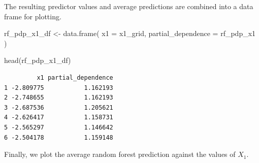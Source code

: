 \documentclass[
  letterpaper,
  DIV=11,
  numbers=noendperiod]{scrreprt}
\newenvironment{Shaded}{\begin{snugshade}}{\end{snugshade}}
\newcommand{\AttributeTok}[1]{\textcolor[rgb]{0.40,0.45,0.13}{#1}}
\newcommand{\ControlFlowTok}[1]{\textcolor[rgb]{0.00,0.23,0.31}{\textbf{#1}}}
\newcommand{\FunctionTok}[1]{\textcolor[rgb]{0.28,0.35,0.67}{#1}}
\newcommand{\NormalTok}[1]{\textcolor[rgb]{0.00,0.23,0.31}{#1}}
\newcommand{\OtherTok}[1]{\textcolor[rgb]{0.00,0.23,0.31}{#1}}
\newcommand{\SpecialCharTok}[1]{\textcolor[rgb]{0.37,0.37,0.37}{#1}}
\begin{document}
\begin{Shaded}
\end{Shaded}

The resulting predictor values and average predictions are combined into
a data frame for plotting.

\begin{Shaded}
\begin{Highlighting}[]
\NormalTok{rf\_pdp\_x1\_df }\OtherTok{\textless{}{-}} \FunctionTok{data.frame}\NormalTok{(}
  \AttributeTok{x1 =}\NormalTok{ x1\_grid,}
  \AttributeTok{partial\_dependence =}\NormalTok{ rf\_pdp\_x1}
\NormalTok{)}

\FunctionTok{head}\NormalTok{(rf\_pdp\_x1\_df)}
\end{Highlighting}
\end{Shaded}

\begin{verbatim}
         x1 partial_dependence
1 -2.809775           1.162193
2 -2.748655           1.162193
3 -2.687536           1.205621
4 -2.626417           1.158731
5 -2.565297           1.146642
6 -2.504178           1.159148
\end{verbatim}

Finally, we plot the average random forest prediction against the values
of \(X_1\).
\end{document}
